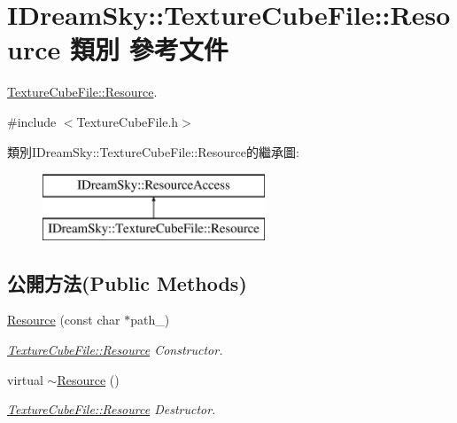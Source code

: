 \hypertarget{class_i_dream_sky_1_1_texture_cube_file_1_1_resource}{}\section{I\+Dream\+Sky\+:\+:Texture\+Cube\+File\+:\+:Resource 類別 參考文件}
\label{class_i_dream_sky_1_1_texture_cube_file_1_1_resource}


\hyperlink{class_i_dream_sky_1_1_texture_cube_file_1_1_resource}{Texture\+Cube\+File\+::\+Resource}.  




{\ttfamily \#include $<$Texture\+Cube\+File.\+h$>$}

類別\+I\+Dream\+Sky\+:\+:Texture\+Cube\+File\+:\+:Resource的繼承圖\+:\begin{figure}[H]
\begin{center}
\leavevmode
\includegraphics[height=2.000000cm]{class_i_dream_sky_1_1_texture_cube_file_1_1_resource}
\end{center}
\end{figure}
\subsection*{公開方法(Public Methods)}
\begin{DoxyCompactItemize}
\item 
\hyperlink{class_i_dream_sky_1_1_texture_cube_file_1_1_resource_a9d2cab584b24e3007b58c2452200ea1f}{Resource} (const char $\ast$path\+\_\+)
\begin{DoxyCompactList}\small\item\em \hyperlink{class_i_dream_sky_1_1_texture_cube_file_1_1_resource}{Texture\+Cube\+File\+::\+Resource} Constructor. \end{DoxyCompactList}\item 
virtual \hyperlink{class_i_dream_sky_1_1_texture_cube_file_1_1_resource_abfc12309eb2f37daa741009cd5b22657}{$\sim$\+Resource} ()
\begin{DoxyCompactList}\small\item\em \hyperlink{class_i_dream_sky_1_1_texture_cube_file_1_1_resource}{Texture\+Cube\+File\+::\+Resource} Destructor. \end{DoxyCompactList}\end{DoxyCompactItemize}
